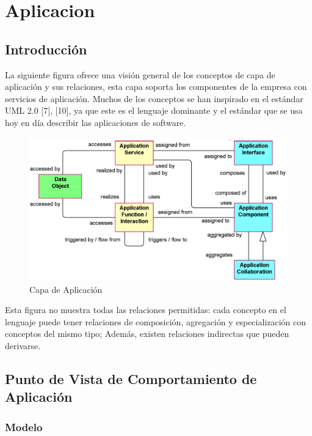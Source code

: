 \chapter{Aplicacion}

\section{Introducción}
La siguiente figura ofrece una visión general de los conceptos de capa de aplicación y sus relaciones, esta capa soporta los componentes de la empresa con servicios de aplicación. Muchos de los conceptos se han inspirado en el estándar UML 2.0 [7], [10], ya que este es el lenguaje dominante y el estándar que se usa hoy en día describir las aplicaciones de software. 

\begin{figure}[th!]
	\centering
	\includegraphics[width=0.7\linewidth]{arquitectura/imagenes/aplicacion}
	\caption{Capa de Aplicación}
	\label{aplicacion}
\end{figure}

Esta figura no muestra todas las relaciones permitidas: cada concepto en el lenguaje puede tener relaciones de composición, agregación y especialización con conceptos del mismo tipo; Además, existen relaciones indirectas que pueden derivarse.
\newpage

\section{Punto de Vista de Comportamiento de Aplicación}

\subsection{Modelo}

